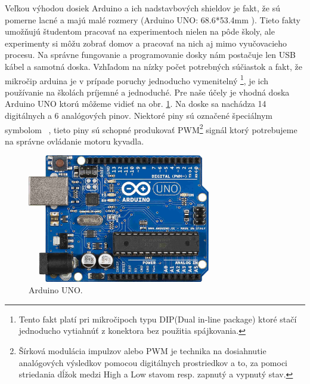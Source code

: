 Veľkou výhodou dosiek Arduino a ich nadstavbových shieldov je fakt, že sú pomerne lacné a majú malé rozmery (Arduino UNO: 68.6*53.4mm \cite{UNO} ). Tieto fakty umožňujú študentom pracovať na experimentoch nielen na pôde školy, ale experimenty si môžu zobrať domov a pracovať na nich aj mimo vyučovacieho procesu. Na správne fungovanie a programovanie dosky nám postačuje len USB kábel a samotná doska. Vzhľadom na nízky počet potrebných súčiastok a fakt, že mikročip arduina je v prípade poruchy jednoducho vymenitelný \footnote[2]{Tento fakt platí pri mikročipoch typu DIP(Dual in-line package) ktoré stačí jednoducho vytiahnúť z konektora bez použitia spájkovania.}, je ich používanie na školách príjemné a jednoduché. Pre naše účely je vhodná doska Arduino UNO ktorú môžeme vidieť na obr. \ref{OBRAZOK 1.3}. Na doske sa nachádza 14 digitálnych a 6 analógových pinov. Niektoré piny sú označené špeciálnym symbolom ~, tieto piny sú schopné produkovať PWM\footnote[3]{Šírková modulácia impulzov alebo PWM je technika na dosiahnutie analógových výsledkov pomocou digitálnych prostriedkov a to, za pomoci striedania dĺžok medzi High a Low stavom resp. zapnutý a vypnutý stav.} signál ktorý potrebujeme na správne ovládanie motoru kyvadla.

\begin{figure}[!tbh]
\centering
\includegraphics[width=80mm]{obr/arduino.jpg}
\caption{{Arduino UNO.}}\label{OBRAZOK 1.3}
\end{figure}



